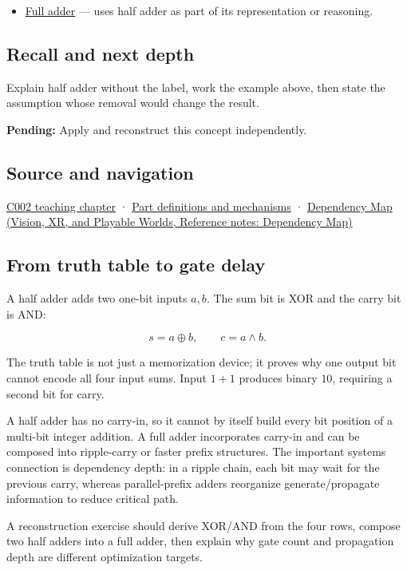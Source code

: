 \hypertarget{appendix-1652d27a8e90-used-by}{}

\begin{itemize}
\tightlist
\item
  \hyperref[appendix-d1a5b1e520c2]{Full adder} --- uses half adder as part of its representation or reasoning.
\end{itemize}

\subsection{Recall and next depth}\label{appendix-1652d27a8e90-recall-and-next-depth}

\hypertarget{appendix-1652d27a8e90-recall-and-next-depth}{}

Explain half adder without the label, work the example above, then state the assumption whose removal would change the result.

\textbf{Pending:} Apply and reconstruct this concept independently.

\subsection{Source and navigation}\label{appendix-1652d27a8e90-source-and-navigation}

\hypertarget{appendix-1652d27a8e90-source-and-navigation}{}

\hyperref[01-foundations-i-ch001-arithmetic-becomes-a-policy]{C002 teaching chapter} · \hyperref[appendix-fd090d982a15]{Part definitions and mechanisms} · \href{../07-Vision-XR-and-Playable-Worlds/main.pdf\#nameddest=appendix-4ad47bdd269a}{Dependency Map (Vision, XR, and Playable Worlds, Reference notes: Dependency Map)}

\subsection{From truth table to gate delay}\label{appendix-1652d27a8e90-from-truth-table-to-gate-delay}

\hypertarget{appendix-1652d27a8e90-from-truth-table-to-gate-delay}{}

A half adder adds two one-bit inputs \(a,b\). The sum bit is XOR and the carry bit is AND:

\[
s=a\oplus b,\qquad c=a\land b.
\]

The truth table is not just a memorization device; it proves why one output bit cannot encode all four input sums. Input \(1+1\) produces binary \(10\), requiring a second bit for carry.

A half adder has no carry-in, so it cannot by itself build every bit position of a multi-bit integer addition. A full adder incorporates carry-in and can be composed into ripple-carry or faster prefix structures. The important systems connection is dependency depth: in a ripple chain, each bit may wait for the previous carry, whereas parallel-prefix adders reorganize generate/propagate information to reduce critical path.

A reconstruction exercise should derive XOR/AND from the four rows, compose two half adders into a full adder, then explain why gate count and propagation depth are different optimization targets.
